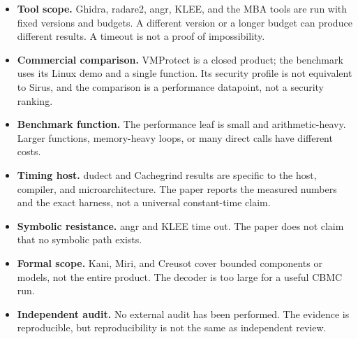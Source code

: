 \begin{itemize}
  \item \textbf{Tool scope.} Ghidra, radare2, angr, KLEE, and the MBA tools are
        run with fixed versions and budgets. A different version or a longer
        budget can produce different results. A timeout is not a proof of
        impossibility.
  \item \textbf{Commercial comparison.} VMProtect is a closed product; the
        benchmark uses its Linux demo and a single function. Its security
        profile is not equivalent to Sirus, and the comparison is a performance
        datapoint, not a security ranking.
  \item \textbf{Benchmark function.} The performance leaf is small and
        arithmetic-heavy. Larger functions, memory-heavy loops, or many direct
        calls have different costs.
  \item \textbf{Timing host.} dudect and Cachegrind results are specific to the
        host, compiler, and microarchitecture. The paper reports the measured
        numbers and the exact harness, not a universal constant-time claim.
  \item \textbf{Symbolic resistance.} angr and KLEE time out. The paper does not
        claim that no symbolic path exists.
  \item \textbf{Formal scope.} Kani, Miri, and Creusot cover bounded components
        or models, not the entire product. The decoder is too large for a
        useful CBMC run.
  \item \textbf{Independent audit.} No external audit has been performed. The
        evidence is reproducible, but reproducibility is not the same as
        independent review.
\end{itemize}
